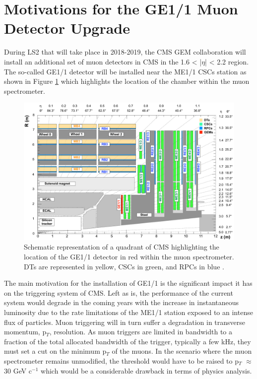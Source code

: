   \section{Motivations for the GE1/1 Muon Detector Upgrade}

    During LS2 that will take place in 2018-2019, the CMS GEM collaboration \cite{Colaleo:2021453} will install an additional set of muon detectors in CMS in the 1.6 < |$\eta$| < 2.2 region. The so-called GE1/1 detector will be installed near the ME1/1 CSCs station as shown in Figure \ref{fig:II-1-ge11} which highlights the location of the chamber within the muon spectrometer. \\

    \begin{figure}[h!]
      \centering
      \includegraphics[width=\textwidth]{img/II-1-gem/ge11-quadrant.pdf}
      \caption{Schematic representation of a quadrant of CMS highlighting the location of the GE1/1 detector in red within the muon spectrometer. DTs are represented in yellow, CSCs in green, and RPCs in blue \cite{Colaleo:2021453}.}
      \label{fig:II-1-ge11}
    \end{figure}

    The main motivation for the installation of GE1/1 is the significant impact it has on the triggering system of CMS. Left as is, the performance of the current system would degrade in the coming years with the increase in instantaneous luminosity due to the rate limitations of the ME1/1 station exposed to an intense flux of particles. Muon triggering will in turn suffer a degradation in transverse momentum, p$_T$, resolution. As muon triggers are limited in bandwidth to a fraction of the total allocated bandwidth of the trigger, typically a few kHz, they must set a cut on the minimum p$_T$ of the muons. In the scenario where the muon spectrometer remains unmodified, the threshold would have to be raised to p$_T$ $ \approx $ 30 GeV c$^{-1}$ which would be a considerable drawback in terms of physics analysis. \\

